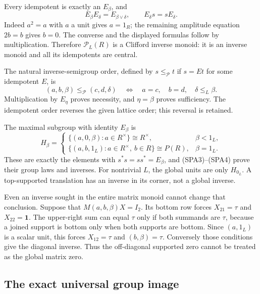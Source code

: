 Every idempotent is exactly an $E_\beta$, and
\begin{equation}\tag{SPA5}
E_\beta E_\delta=E_{\beta\vee\delta},\qquad
E_\delta s=sE_\delta.
\end{equation}
Indeed $a^2=a$ with $a$ a unit gives $a=1_R$; the remaining
amplitude equation $2b=b$ gives $b=0$.
The converse and the displayed formulas follow by multiplication.
Therefore $\mathcal P_L(R)$ is a Clifford inverse monoid:
it is an inverse monoid and all its idempotents are central.

The natural inverse-semigroup order, defined by $s\le_{\mathcal P}t$
if $s=Et$ for some idempotent $E$, is
\begin{equation}\tag{SPA6}
(a,b,\beta)\le_{\mathcal P}(c,d,\delta)
\quad\Longleftrightarrow\quad
a=c,\quad b=d,\quad\delta\le_L\beta.
\end{equation}
Multiplication by $E_\eta$ proves necessity, and $\eta=\beta$
proves sufficiency. The idempotent order reverses the given
lattice order; this reversal is retained.

The maximal subgroup with identity $E_\beta$ is
\begin{equation}\tag{SPA7}
H_\beta=
\begin{cases}
\{(a,0,\beta):a\in R^\times\}\cong R^\times,&\beta<1_L,\\
\{(a,b,1_L):a\in R^\times,\ b\in R\}\cong P(R),&\beta=1_L.
\end{cases}
\end{equation}
These are exactly the elements with $s^*s=ss^*=E_\beta$, and
(SPA3)--(SPA4) prove their group laws and inverses.
For nontrivial $L$, the global units are only $H_{0_L}$.
A top-supported translation has an inverse in its corner,
not a global inverse.

Even an inverse sought in the entire matrix monoid cannot
change that conclusion. Suppose that $M(a,b,\beta)X=I_2$.
Its bottom
row forces $X_{21}=\tau$ and $X_{22}=\mathbf1$.
The upper-right sum can equal $\tau$ only if both summands
are $\tau$, because a joined support is bottom only when
both supports are bottom. Since $(a,1_L)$ is a scalar unit,
this forces $X_{12}=\tau$ and $(b,\beta)=\tau$.
Conversely those conditions give the diagonal inverse.
Thus the off-diagonal supported zero cannot be treated as
the global matrix zero.

\subsection{The exact universal group image}

